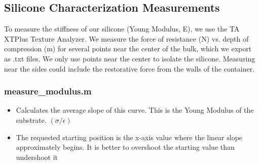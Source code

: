 \subsection{Silicone Characterization Measurements}
To measure the stiffness of our silicone (Young Modulus, E), we use the TA XTPlus Texture Analyzer. We measure the force of resistance (N) vs. depth of compression (m) for several points near the center of the bulk, which we export as .txt files. We only use points near the center to isolate the silicone. Measuring near the sides could include the restorative force from the walls of the container.
\subsubsection*{measure\_modulus.m}
\begin{itemize}
	\item Calculates the average slope of this curve. This is the Young Modulus of the substrate.  $(\sigma/\epsilon)$
	\item The requested starting position is the x-axis value where the linear slope approximately begins. It is better to overshoot the starting value than undershoot it
\end{itemize}

